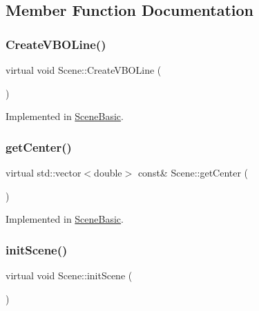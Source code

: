 \subsection{Member Function Documentation}
\hypertarget{class_scene_a2e371aa848e8c30f593c2d9a2687dd28}{}\label{class_scene_a2e371aa848e8c30f593c2d9a2687dd28} 
\subsubsection{\texorpdfstring{Create\+V\+B\+O\+Line()}{CreateVBOLine()}}
{\footnotesize\ttfamily virtual void Scene\+::\+Create\+V\+B\+O\+Line (\begin{DoxyParamCaption}{ }\end{DoxyParamCaption})\hspace{0.3cm}{\ttfamily [pure virtual]}}



Implemented in \hyperlink{class_scene_basic_ac0cc945b040983d7527cda36963ec711}{Scene\+Basic}.

\hypertarget{class_scene_a15d25044dbd65a8d7d0759888fcd55a1}{}\label{class_scene_a15d25044dbd65a8d7d0759888fcd55a1} 
\subsubsection{\texorpdfstring{get\+Center()}{getCenter()}}
{\footnotesize\ttfamily virtual std\+::vector$<$double$>$ const\& Scene\+::get\+Center (\begin{DoxyParamCaption}{ }\end{DoxyParamCaption})\hspace{0.3cm}{\ttfamily [pure virtual]}}



Implemented in \hyperlink{class_scene_basic_ac805ba94deedc1f4d606d9554d088ea0}{Scene\+Basic}.

\hypertarget{class_scene_ae76b830c1156bb40bd744afb63776be2}{}\label{class_scene_ae76b830c1156bb40bd744afb63776be2} 
\subsubsection{\texorpdfstring{init\+Scene()}{initScene()}}
{\footnotesize\ttfamily virtual void Scene\+::init\+Scene (\begin{DoxyParamCaption}{ }\end{DoxyParamCaption})\hspace{0.3cm}{\ttfamily [pure virtual]}}

